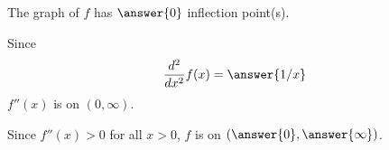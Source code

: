 \documentclass{ximera}
\begin{document}
\begin{exercise}
\begin{exercise}
\begin{exercise}
\begin{exercise}
\begin{exercise}
\begin{exercise}
\begin{exercise}
\begin{exercise}
\begin{exercise}
The graph of $f$ has $\answer{0}$ inflection point(s).
\begin{exercise}
Since
\[
\frac{d^2}{dx^2}f(x)=\answer{1/x}
\]
$f''(x)$ is  on $(0,\infty)$. 
\begin{exercise}
Since $f''(x)>0$ for all $x>0$, $f$ is  on $\left( \answer{0},\answer{\infty} \right)$.
\end{exercise}
\end{exercise}
\end{exercise}
\end{exercise}
\end{exercise}
\end{exercise}
\end{exercise}
\end{exercise}
\end{exercise}
\end{exercise}
\end{exercise}
\end{document}
